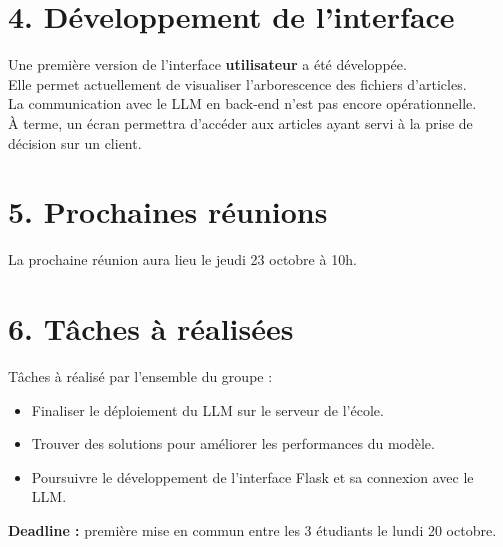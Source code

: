 \documentclass[a4paper,11pt]{article}
\begin{document}
\section*{4. Développement de l’interface}
Une première version de l’interface \textbf{utilisateur} a été développée. \\
Elle permet actuellement de visualiser l’arborescence des fichiers d’articles. \\
La communication avec le LLM en back-end n’est pas encore opérationnelle. \\
À terme, un écran permettra d’accéder aux articles ayant servi à la prise de décision sur un client.

\section*{5. Prochaines réunions}
La prochaine réunion aura lieu le jeudi 23 octobre à 10h.


\section*{6. Tâches à réalisées}
Tâches à réalisé par l'ensemble du groupe :
\begin{itemize}
    \item Finaliser le déploiement du LLM sur le serveur de l’école.
    \item Trouver des solutions pour améliorer les performances du modèle.
    \item Poursuivre le développement de l’interface Flask et sa connexion avec le LLM.
    
\end{itemize}
\textbf{Deadline :} première mise en commun entre les 3 étudiants le lundi 20 octobre.
\end{document}
